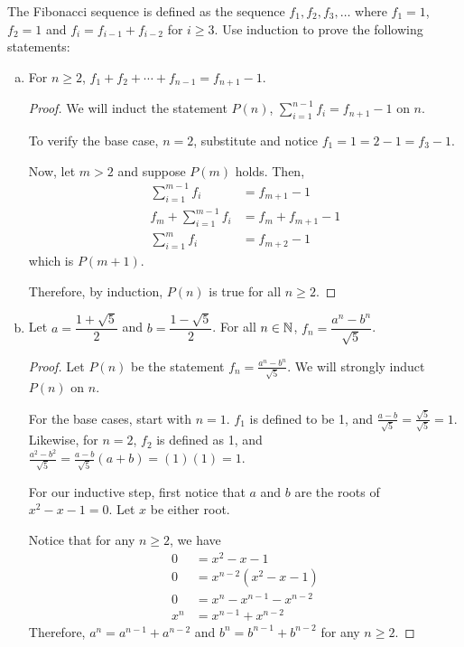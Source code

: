 \question The Fibonacci sequence is defined as the sequence $f_1, f_2, f_3, \dots$
where $f_1=1$, $f_2=1$ and $f_i=f_{i-1}+f_{i-2}$ for $i \geq 3$.
Use induction to prove the following statements:
\begin{enumerate}[(a)]
  \item For $n \geq 2$, $f_1 + f_2 + \cdots + f_{n-1} = f_{n+1} - 1$.
        \begin{proof}
          We will induct the statement $P(n)$, $\sum_{i=1}^{n-1} f_i = f_{n+1}-1$ on $n$.

          To verify the base case, $n = 2$, substitute and notice $f_1 = 1 = 2-1 = f_3-1$.

          Now, let $m > 2$ and suppose $P(m)$ holds. Then,
          \begin{align*}
            \sum_{i=1}^{m-1} f_i       & = f_{m+1}-1         \\
            f_m + \sum_{i=1}^{m-1} f_i & = f_m + f_{m+1} - 1 \\
            \sum_{i=1}^{m} f_i         & = f_{m+2}-1
          \end{align*}
          which is $P(m+1)$.

          Therefore, by induction, $P(n)$ is true for all $n \geq 2$.
        \end{proof}
  \item Let $a = \dfrac{1+\sqrt{5}}{2}$ and $b = \dfrac{1-\sqrt{5}}{2}$.
        For all $n\in\mathbb{N}$, $f_n = \dfrac{a^n-b^n}{\sqrt{5}}$.
        \begin{proof}
          Let $P(n)$ be the statement $f_n = \frac{a^n-b^n}{\sqrt{5}}$.
          We will strongly induct $P(n)$ on $n$.

          For the base cases, start with $n=1$.
          $f_1$ is defined to be 1, and $\frac{a-b}{\sqrt{5}} = \frac{\sqrt{5}}{\sqrt{5}} = 1$.
          Likewise, for $n=2$, $f_2$ is defined as 1, and
          $\frac{a^2-b^2}{\sqrt{5}}=\frac{a-b}{\sqrt{5}}(a+b)=(1)(1)=1$.

          For our inductive step, first notice that $a$ and $b$ are the roots of $x^2-x-1=0$.
          Let $x$ be either root.

          Notice that for any $n \geq 2$, we have
          \begin{align*}
            0   & = x^2-x-1                 \\
            0   & = x^{n-2}(x^2-x-1)        \\
            0   & = x^n - x^{n-1} - x^{n-2} \\
            x^n & = x^{n-1} + x^{n-2}
          \end{align*}
          Therefore, $a^n = a^{n-1}+a^{n-2}$ and $b^n = b^{n-1}+b^{n-2}$ for any $n \geq 2$.


\end{proof}
\end{enumerate}
